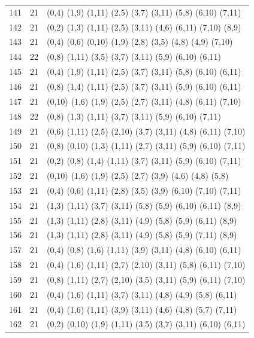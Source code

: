 \begin{appendix}
{\begin{longtable}{lll}
141& 21 & (0,4)   (1,9)  (1,11) (2,5)   (3,7)   (3,11)  (5,8)   (6,10)  (7,11)\\
142& 21 & (0,2)   (1,3)  (1,11) (2,5)   (3,11)  (4,6)   (6,11)  (7,10)  (8,9)\\
143& 21 & (0,4)   (0,6)  (0,10) (1,9)   (2,8)   (3,5)   (4,8)   (4,9)   (7,10)\\
144& 22 & (0,8)   (1,11) (3,5)  (3,7)   (3,11)  (5,9)   (6,10)  (6,11)  \\
145& 21 & (0,4)   (1,9)  (1,11) (2,5)   (3,7)   (3,11)  (5,8)   (6,10)  (6,11)\\
146& 21 & (0,8)   (1,4)  (1,11) (2,5)   (3,7)   (3,11)  (5,9)   (6,10)  (6,11)\\
147& 21 & (0,10)  (1,6)  (1,9)  (2,5)   (2,7)   (3,11)  (4,8)   (6,11)  (7,10)\\
148& 22 & (0,8)   (1,3)  (1,11) (3,7)   (3,11)  (5,9)   (6,10)  (7,11)  \\
149& 21 & (0,6)   (1,11) (2,5)  (2,10)  (3,7)   (3,11)  (4,8)   (6,11)  (7,10)\\
150& 21 & (0,8)   (0,10) (1,3)  (1,11)  (2,7)   (3,11)  (5,9)   (6,10)  (7,11)\\
151& 21 & (0,2)   (0,8)  (1,4)  (1,11)  (3,7)   (3,11)  (5,9)   (6,10)  (7,11)\\
152& 21 & (0,10)  (1,6)  (1,9)  (2,5)   (2,7)   (3,9)   (4,6)   (4,8)   (5,8)\\
153& 21 & (0,4)   (0,6)  (1,11) (2,8)   (3,5)   (3,9)   (6,10)  (7,10)  (7,11)\\
154& 21 & (1,3)   (1,11) (3,7)  (3,11)  (5,8)   (5,9)   (6,10)  (6,11)  (8,9)\\
155& 21 & (1,3)   (1,11) (2,8)  (3,11)  (4,9)   (5,8)   (5,9)   (6,11)  (8,9)\\
156& 21 & (1,3)   (1,11) (2,8)  (3,11)  (4,9)   (5,8)   (5,9)   (7,11)  (8,9)\\
157& 21 & (0,4)   (0,8)  (1,6)  (1,11)  (3,9)   (3,11)  (4,8)   (6,10)  (6,11)\\
158& 21 & (0,4)   (1,6)  (1,11) (2,7)   (2,10)  (3,11)  (5,8)   (6,11)  (7,10)\\
159& 21 & (0,8)   (1,11) (2,7)  (2,10)  (3,5)   (3,11)  (5,9)   (6,11)  (7,10)\\
160& 21 & (0,4)   (1,6)  (1,11) (3,7)   (3,11)  (4,8)   (4,9)   (5,8)   (6,11)\\
161& 21 & (0,4)   (1,6)  (1,11) (3,9)   (3,11)  (4,6)   (4,8)   (5,7)   (7,11)\\
162& 21 & (0,2)   (0,10) (1,9)  (1,11)  (3,5)   (3,7)   (3,11)  (6,10)  (6,11)\\

\end{longtable}}
\end{appendix}
